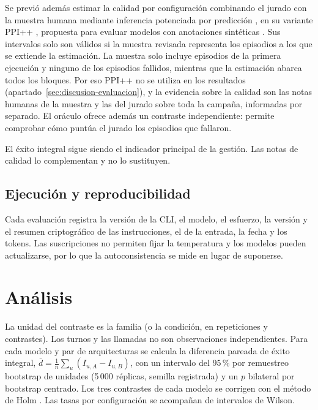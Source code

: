 Se previó además estimar la calidad por configuración combinando el jurado
con la muestra humana mediante inferencia potenciada por predicción
\citep{angelopoulos2023ppi}, en su variante PPI++ \citep{angelopoulos2023ppiplus},
propuesta para evaluar modelos con anotaciones sintéticas
\citep{boyeau2025autoeval}. Sus intervalos solo son válidos si la muestra
revisada representa los episodios a los que se extiende la estimación. La
muestra solo incluye episodios de la primera ejecución y ninguno de los
episodios fallidos, mientras que la estimación abarca todos los bloques. Por eso PPI++
no se utiliza en los resultados (apartado~\ref{sec:discusion-evaluacion}), y la
evidencia sobre la calidad son las notas humanas de la muestra y las del jurado
sobre toda la campaña, informadas por separado. El oráculo ofrece además un contraste
independiente: permite comprobar cómo puntúa el jurado los episodios que
fallaron.

El éxito integral sigue siendo el indicador principal de la gestión. Las notas
de calidad lo complementan y no lo sustituyen.

\subsection{Ejecución y reproducibilidad}

Cada evaluación registra la versión de la CLI, el modelo, el esfuerzo, la
versión y el resumen criptográfico de las instrucciones, el de la entrada, la
fecha y los tokens. Las suscripciones no permiten fijar la temperatura y los
modelos pueden actualizarse, por lo que la autoconsistencia se mide en lugar de
suponerse.

\section{Análisis}
\label{sec:metodo-analisis}

La unidad del contraste es la familia (o la condición, en repeticiones y
contrastes). Los turnos y las llamadas no son observaciones
independientes. Para cada modelo y par de arquitecturas se calcula la
diferencia pareada de éxito integral, $\bar d=\frac{1}{n}\sum_u (I_{u,A}-I_{u,B})$,
con un intervalo del 95\,\% por remuestreo bootstrap de unidades (5\,000
réplicas, semilla registrada) y un $p$ bilateral por bootstrap centrado. Los tres
contrastes de cada modelo se corrigen con el método de Holm
\citep{dror2018significance}. Las tasas por configuración se acompañan de
intervalos de Wilson.

